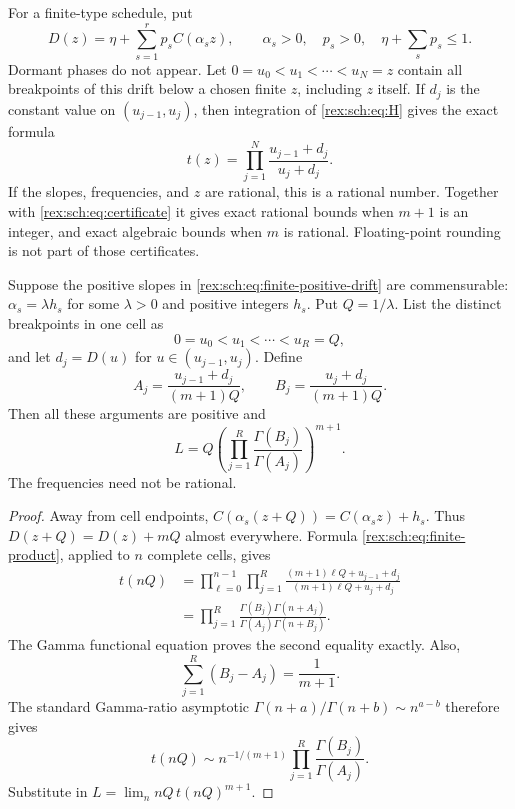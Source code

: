 For a finite-type schedule, put
\begin{equation}\label{rex:sch:eq:finite-positive-drift}
 D(z)=\eta+\sum_{s=1}^r p_s C(\alpha_s z),
 \qquad \alpha_s>0,\quad p_s>0,
 \quad\eta+\sum_s p_s\leq1.
\end{equation}
Dormant phases do not appear. Let $0=u_0<u_1<\cdots<u_N=z$ contain
all breakpoints of this drift below a chosen finite $z$, including
$z$ itself. If $d_j$ is the constant value on $(u_{j-1},u_j)$, then
integration of \eqref{rex:sch:eq:H} gives the exact formula
\begin{equation}\label{rex:sch:eq:finite-product}
 t(z)=\prod_{j=1}^N\frac{u_{j-1}+d_j}{u_j+d_j}.
\end{equation}
If the slopes, frequencies, and $z$ are rational, this is a rational
number. Together with \eqref{rex:sch:eq:certificate} it gives exact rational
bounds when $m+1$ is an integer, and exact algebraic bounds when $m$
is rational. Floating-point rounding is not part of those certificates.

\begin{theorem}\label{rex:sch:thm:gamma}
Suppose the positive slopes in \eqref{rex:sch:eq:finite-positive-drift} are
commensurable: $\alpha_s=\lambda h_s$ for some $\lambda>0$ and
positive integers $h_s$. Put $Q=1/\lambda$. List the distinct
breakpoints in one cell as
\[
 0=u_0<u_1<\cdots<u_R=Q,
\]
and let $d_j=D(u)$ for $u\in(u_{j-1},u_j)$. Define
\begin{equation}\label{rex:sch:eq:gamma-parameters}
 A_j=\frac{u_{j-1}+d_j}{(m+1)Q},\qquad
 B_j=\frac{u_j+d_j}{(m+1)Q}.
\end{equation}
Then all these arguments are positive and
\begin{equation}\label{rex:sch:eq:gamma-main}
 \boxed{\displaystyle
 L=Q\left(\prod_{j=1}^R\frac{\Gamma(B_j)}{\Gamma(A_j)}
 \right)^{m+1}.}
\end{equation}
The frequencies need not be rational.
\end{theorem}

\begin{proof}
Away from cell endpoints, $C(\alpha_s(z+Q))=C(\alpha_s z)+h_s$.
Thus $D(z+Q)=D(z)+mQ$ almost everywhere. Formula
\eqref{rex:sch:eq:finite-product}, applied to $n$ complete cells, gives
\begin{align*}
 t(nQ)
 &=\prod_{\ell=0}^{n-1}\prod_{j=1}^R
 \frac{(m+1)\ell Q+u_{j-1}+d_j}
 {(m+1)\ell Q+u_j+d_j}\\
 &=\prod_{j=1}^R
 \frac{\Gamma(B_j)\Gamma(n+A_j)}
 {\Gamma(A_j)\Gamma(n+B_j)}.
\end{align*}
The Gamma functional equation proves the second equality exactly.
Also,
\[
 \sum_{j=1}^R(B_j-A_j)=\frac{1}{m+1}.
\]
The standard Gamma-ratio asymptotic
$\Gamma(n+a)/\Gamma(n+b)\sim n^{a-b}$ \cite[\S5.11(iii)]{dlmf}
therefore gives
\[
 t(nQ)\sim n^{-1/(m+1)}
 \prod_{j=1}^R\frac{\Gamma(B_j)}{\Gamma(A_j)}.
\]
Substitute in $L=\lim_n nQ\,t(nQ)^{m+1}$.
\end{proof}

